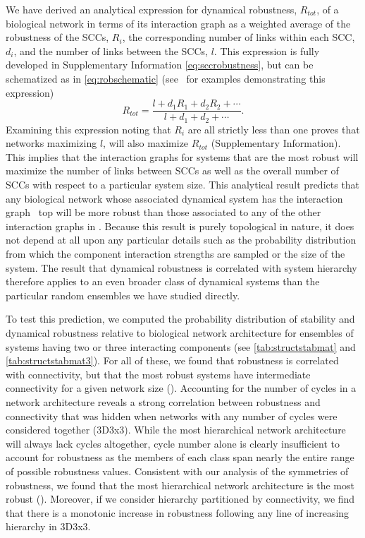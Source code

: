 We have derived an analytical expression for dynamical robustness, $R_{tot}$, of a biological network in terms of its interaction graph as a weighted average of the robustness of the SCCs, $R_i$, the corresponding number of links within each SCC, $d_i$, and the number of links between the SCCs, $l$. This expression is fully developed in Supplementary Information \ref{eq:sccrobustness}, but can be schematized as in \ref{eq:robschematic} (see $\,$ for examples demonstrating this expression)
\begin{equation}\label{eq:robschematic}
R_{tot} = \frac{l+d_1 R_1 + d_2 R_2 + \cdots}{l+d_1 + d_2 + \cdots}.
\end{equation}
Examining this expression noting that $R_i$ are all strictly less than one proves that networks maximizing $l$, will also maximize $R_{tot}$ (Supplementary Information).
This implies that the interaction graphs for systems that are the most robust will maximize the number of links between SCCs as well as the overall number of SCCs with respect to a particular system size. This analytical result predicts that any biological network whose associated dynamical system has the interaction graph  $\,$ top will be more robust than those associated to any of the other interaction graphs in . Because this result is purely topological in nature, it does not depend at all upon any particular details such as the probability distribution from which the component interaction strengths are sampled or the size of the system. The result that dynamical robustness is correlated with system hierarchy therefore applies to an even broader class of dynamical systems than the particular random ensembles we have studied directly.

To test this prediction, we computed the probability distribution of stability and dynamical robustness relative to biological network architecture for ensembles of systems having two or three interacting components (see \ref{tab:structstabmat} and \ref{tab:structstabmat3}). For all of these, we found that robustness is correlated with connectivity, but that the most robust systems have intermediate connectivity for a given network size (). Accounting for the number of cycles in a network architecture reveals a strong correlation between robustness and connectivity that was hidden when networks with any number of cycles were considered together (3D3x3). While the most hierarchical network architecture will always lack cycles altogether, cycle number alone is clearly insufficient to account for robustness as the members of each class span nearly the entire range of possible robustness values. Consistent with our analysis of the symmetries of robustness, we found that the most hierarchical network architecture is the most robust (). Moreover, if we consider hierarchy partitioned by connectivity, we find that there is a monotonic increase in robustness following any line of increasing hierarchy in 3D3x3.

